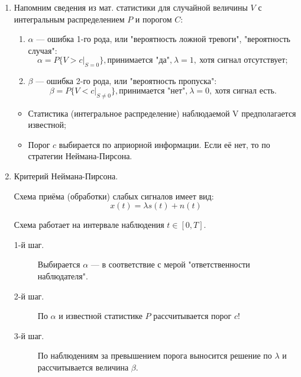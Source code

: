 \documentclass[../main/main.tex]{subfiles}
\begin{document}
\begin{enumerate}
    \item Напомним сведения из мат. статистики для случайной величины $V$ с интегральным распределением $P$ и порогом $C$:
    \begin{enumerate}
        \item $\alpha$ --- ошибка 1-го рода, или "вероятность ложной тревоги"{}, "вероятность случая":
        \begin{equation}
            \alpha = P\{\left.V>c \right|_{S = 0} \}, \text{принимается "да"{},}~\lambda=1,~\text{хотя сигнал отсутствует};
        \end{equation}
        
        \item $\beta$ --- ошибка 2-го рода, или "вероятность пропуска":
        \begin{equation}
            \beta = P\{\left.V<c \right|_{S \neq 0} \}, \text{принимается "нет"{},}~\lambda=0,~\text{хотя сигнал есть}.
        \end{equation}
    \end{enumerate}
    
    \begin{itemize}
        \item Статистика (интегральное распределение) наблюдаемой V предполагается известной;
        \item Порог $c$ выбирается по априорной информации. Если её нет, то по стратегии Неймана-Пирсона.
    \end{itemize}
    
    \item Критерий Неймана-Пирсона.
    
    Схема приёма (обработки) слабых сигналов имеет вид: 
    \begin{equation}
        x(t) = \lambda s(t) + n(t)
    \end{equation}
    
    Схема работает на интервале наблюдения $t \in [0, T]$.
    \begin{description}
        \item[1-й шаг.] Выбирается $\alpha$ --- в соответствие с мерой "ответственности наблюдателя".
        \item[2-й шаг.] По $\alpha$ и известной статистике $P$ рассчитывается порог $c$!
        \item[3-й шаг.] По наблюдениям за превышением порога выносится решение по $\lambda$ и рассчитывается величина $\beta$.
    \end{description}
    

\end{enumerate}
\end{document}
